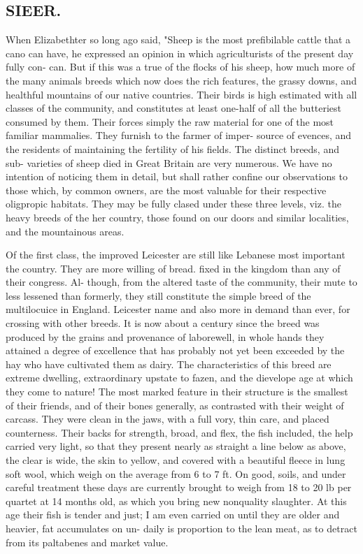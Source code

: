 \subsection*{SIEER.}
When Elizabethter so long ago said, "Sheep is the most prefibilable cattle that a cano can have, he expressed an opinion in which agriculturists of the present day fully con- can. But if this was a true of the flocks of his sheep, how much more of the many animals breeds which now does the rich features, the grassy downs, and healthful mountains of our native countries. Their birds is high estimated with all classes of the community, and constitutes at least one-half of all the butteriest consumed by them. Their forces simply the raw material for one of the most familiar mammalies. They furnish to the farmer of imper- source of evences, and the residents of maintaining the fertility of his fields. The distinct breeds, and sub- varieties of sheep died in Great Britain are very numerous. We have no intention of noticing them in detail, but shall rather confine our observations to those which, by common owners, are the most valuable for their respective oligpropic habitats. They may be fully clased under these three levels, viz. the heavy breeds of the her country, those found on our doors and similar localities, and the mountainous areas.\par\medskip
Of the first class, the improved Leicester are still like Lebanese most important the country. They are more willing of bread. fixed in the kingdom than any of their congress. Al- though, from the altered taste of the community, their mute to less lessened than formerly, they still constitute the simple breed of the multilocuice in England. Leicester name and also more in demand than ever, for crossing with other breeds. It is now about a century since the breed was produced by the grains and provenance of laborewell, in whole hands they attained a degree of excellence that has probably not yet been exceeded by the hay who have cultivated them as dairy. The characteristics of this breed are extreme dwelling, extraordinary upstate to fazen, and the dievelope age at which they come to nature! The most marked feature in their structure is the smallest of their friends, and of their bones generally, as contrasted with their weight of carcass. They were clean in the jaws, with a full vory, thin care, and placed counterness. Their backs for strength, broad, and flex, the fish included, the help carried very light, so that they present nearly as straight a line below as above, the clear is wide, the skin to yellow, and covered with a beautiful fleece in lung soft wool, which weigh on the average from 6 to 7 ft. On good, soils, and under careful treatment these days are currently brought to weigh from 18 to 20 lb per quartet at 14 months old, as which you bring new nonquality slaughter. At this age their fish is tender and just; I am even carried on until they are older and heavier, fat accumulates on un- daily is proportion to the lean meat, as to detract from its paltabenes and market value.\par\medskip
